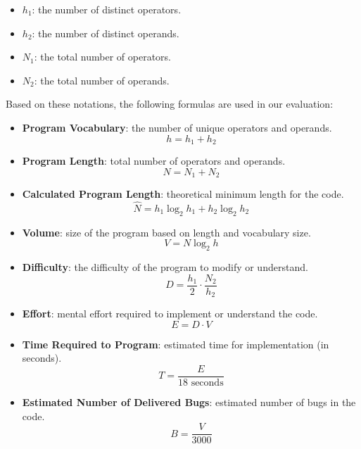 \documentclass{DESSThesis}
\begin{document}
\begin{itemize}[noitemsep, topsep=0pt]
\item $h_1$:  the number of distinct operators.
\item $h_2$: the number of distinct operands.
\item $N_1$: the total number of operators.
\item $N_2$: the total number of operands.
\end{itemize}

\noindent Based on these notations, the following formulas are used in our evaluation:

\begin{itemize}
  \item \textbf{Program Vocabulary}: the number of unique operators and operands.
    \begin{equation}
        h = h_1 + h_2
    \end{equation}
  \item \textbf{Program Length}: total number of operators and operands.
    \begin{equation}
        N = N_1 + N_2
    \end{equation}
  \item \textbf{Calculated Program Length}: theoretical minimum length for the code.
    \begin{equation}
        \hat{N} = h_1 \log_2 h_1 + h_2 \log_2 h_2
    \end{equation}
  \item \textbf{Volume}: size of the program based on length and vocabulary size.
    \begin{equation}
        V = N \log_2 h
    \end{equation}
  \item \textbf{Difficulty}: the difficulty of the program to modify or understand.
    \begin{equation}
        D = \frac{h_1}{2} \cdot \frac{N_2}{h_2}
    \end{equation}
  \item \textbf{Effort}: mental effort required to implement or understand the code.
    \begin{equation}
        E = D \cdot V
    \end{equation}
  \item \textbf{Time Required to Program}: estimated time for implementation (in seconds).
    \begin{equation}
        T = \frac{E}{18 \text{ seconds}}
    \end{equation}
  \item \textbf{Estimated Number of Delivered Bugs}: estimated number of bugs in the code.
    \begin{equation}
        B = \frac{V}{3000}
    \end{equation}
\end{itemize}
\end{document}
